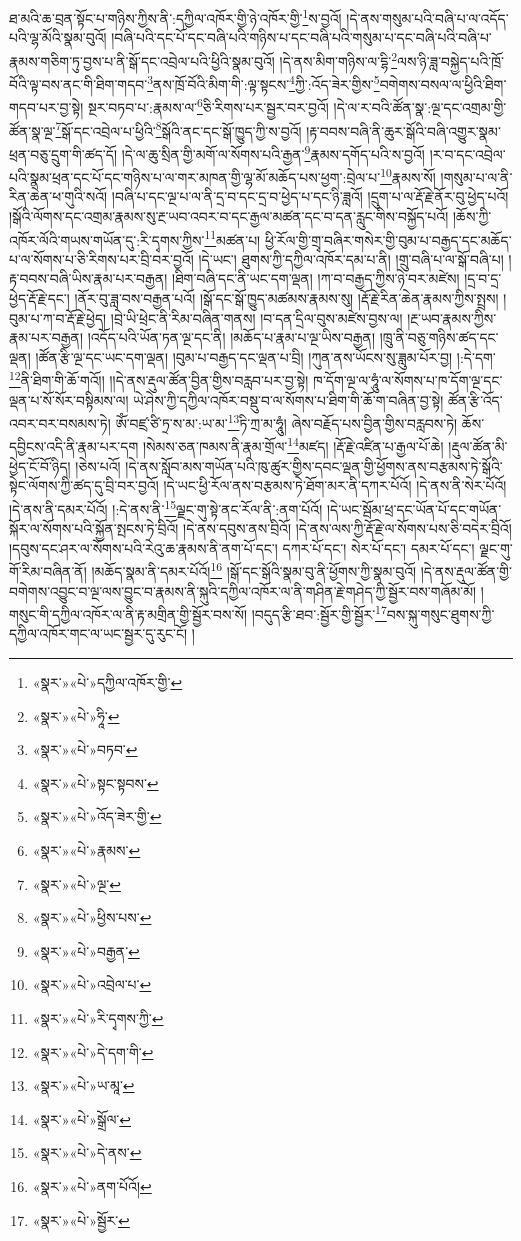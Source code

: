 ཐ་མའི་ཆ་བྲན་སྟོང་པ་གཉིས་ཀྱིས་ནི་:དཀྱིལ་འཁོར་གྱི་ཉེ་འཁོར་གྱི་\footnote{«སྣར་»«པེ་»དཀྱིལ་འཁོར་གྱི་}ས་བྱའོ། །དེ་ནས་གསུམ་པའི་བཞི་པ་ལ་འདོད་པའི་ལྷ་མོའི་སྣམ་བུའོ། །བཞི་པའི་དང་པོ་དང་བཞི་པའི་གཉིས་པ་དང་བཞི་པའི་གསུམ་པ་དང་བཞི་པའི་བཞི་པ་རྣམས་གཅིག་ཏུ་བྱས་པ་ནི་སྒོ་དང་འབྲེལ་པའི་ཕྱིའི་སྣམ་བུའོ། །དེ་ནས་མིག་གཉིས་ལ་དྷི་\footnote{«སྣར་»«པེ་»ཧཱི་}ལས་ཉི་ཟླ་བསྐྱེད་པའི་ཁྲོ་བོའི་ལྟ་བས་ནང་གི་ཐིག་གདབ་\footnote{«སྣར་»«པེ་»བཏབ་}ནས་ཁྲོ་བོའི་མིག་གི་:ལྟ་སྟངས་\footnote{«སྣར་»«པེ་»སྟང་སྟབས་}ཀྱི་:འོད་ཟེར་གྱིས་\footnote{«སྣར་»«པེ་»འོད་ཟེར་གྱི་}བགེགས་བསལ་ལ་ཕྱིའི་ཐིག་གདབ་པར་བྱ་སྟེ། སྔར་བཏབ་པ་:རྣམས་ལ་\footnote{«སྣར་»«པེ་»རྣམས་}ཅི་རིགས་པར་སྦྱར་བར་བྱའོ། །དེ་ལ་ར་བའི་ཚོན་སྣ་:ལྔ་དང་འགྲམ་གྱི་ཚོན་སྣ་ལྔ་\footnote{«སྣར་»«པེ་»ལྔ་}སྒོ་དང་འབྲེལ་པ་ཕྱིའི་\footnote{«སྣར་»«པེ་»ཕྱིས་པས་}སྒོའི་ནང་དང་སྒོ་ཁྱུད་ཀྱི་ས་བྱའོ། །རྟ་བབས་བཞི་ནི་ཆུར་སྒོའི་བཞི་འགྱུར་སྣམ་ཕྲན་བཅུ་དྲུག་གི་ཚད་དོ། །དེ་ལ་ཆུ་སྲིན་གྱི་མགོ་ལ་སོགས་པའི་རྒྱན་\footnote{«སྣར་»«པེ་»བརྒྱན་}རྣམས་དགོད་པའི་ས་བྱའོ། །ར་བ་དང་འབྲེལ་པའི་སྣམ་ཕྲན་དང་པོ་དང་གཉིས་པ་ལ་གར་མཁན་གྱི་ལྷ་མོ་མཆོད་པས་ཕྱག་:བྲེལ་པ་\footnote{«སྣར་»«པེ་»འབྲེལ་པ་}རྣམས་སོ། །གསུམ་པ་ལ་ནི་རིན་ཆེན་ཕ་གུའི་སའོ། །བཞི་པ་དང་ལྔ་པ་ལ་ནི་དྲ་བ་དང་དྲ་བ་ཕྱེད་པ་དང་ཉི་ཟླའོ། །དྲུག་པ་ལ་རྡོ་རྗེ་ནོར་བུ་ཕྱེད་པའོ། །སྒོའི་ལོགས་དང་འགྲམ་རྣམས་སུ་རྔ་ཡབ་འབར་བ་དང་རྒྱལ་མཚན་དང་བ་དན་རླུང་གིས་བསྐྱོད་པའོ། །ཆོས་ཀྱི་འཁོར་ལོའི་གཡས་གཡོན་དུ་:རི་དྭགས་ཀྱིས་\footnote{«སྣར་»«པེ་»རི་དྭགས་ཀྱི་}མཚན་པ། ཕྱི་རོལ་གྱི་གྲྭ་བཞིར་གསེར་གྱི་བུམ་པ་བརྒྱད་དང་མཆོད་པ་ལ་སོགས་པ་ཅི་རིགས་པར་བྲི་བར་བྱའོ། །དེ་ཡང་། ཐུགས་ཀྱི་དཀྱིལ་འཁོར་དམ་པ་ནི། །གྲུ་བཞི་པ་ལ་སྒོ་བཞི་པ། །རྟ་བབས་བཞི་ཡིས་རྣམ་པར་བརྒྱན། །ཐིག་བཞི་དང་ནི་ཡང་དག་ལྡན། །ཀ་བ་བརྒྱད་ཀྱིས་ཉེ་བར་མཛེས། །དྲ་བ་དྲ་ཕྱེད་རྡོ་རྗེ་དང་། །ནོར་བུ་ཟླ་བས་བརྒྱན་པའོ། །སྒོ་དང་སྒོ་ཁྱུད་མཚམས་རྣམས་སུ། །རྡོ་རྗེ་རིན་ཆེན་རྣམས་ཀྱིས་སྤྲས། །བུམ་པ་ཀ་བ་རྡོ་རྗེ་ཕྱེད། །བྲེ་ཡི་ཕྲེང་ནི་རིམ་བཞིན་གནས། །བ་དན་དྲིལ་བུས་མཛེས་བྱས་ལ། །རྔ་ཡབ་རྣམས་ཀྱིས་རྣམ་པར་བརྒྱན། །འདོད་པའི་ཡོན་ཏན་ལྔ་དང་ནི། །མཆོད་པ་རྣམ་པ་ལྔ་ཡིས་བརྒྱན། །ཁྲུ་ནི་བཅུ་གཉིས་ཚད་དང་ལྡན། །ཚོན་རྩི་ལྔ་དང་ཡང་དག་ལྡན། །བུམ་པ་བརྒྱད་དང་ལྡན་པ་བྲི། །ཀུན་ནས་ཡོངས་སུ་ཟླུམ་པོར་བྱ། །:དེ་དག་\footnote{«སྣར་»«པེ་»དེ་དག་གི་}ནི་ཐིག་གི་ཆོ་གའོ།། །།དེ་ནས་རྡུལ་ཚོན་བྱིན་གྱིས་བརླབ་པར་བྱ་སྟེ། ཁ་དོག་ལྔ་ལ་ཧཱུཾ་ལ་སོགས་པ་ཁ་དོག་ལྔ་དང་ལྡན་པ་སོ་སོར་བསྟིམས་ལ། ཡེ་ཤེས་ཀྱི་དཀྱིལ་འཁོར་བསྡུ་བ་ལ་སོགས་པ་ཐིག་གི་ཆོ་ག་བཞིན་བྱ་སྟེ། ཚོན་རྩི་འོད་འབར་བར་བསམས་ཏེ། ཨོཾ་བཛྲ་ཙི་ཏྲ་ས་མ་:ཡ་མ་\footnote{«སྣར་»«པེ་»ཡ་མཱ་}ཏི་ཀྲ་མ་ཧཱུཾ། ཞེས་བརྗོད་པས་བྱིན་གྱིས་བརླབས་ཏེ། ཆོས་དབྱིངས་འདི་ནི་རྣམ་པར་དག །སེམས་ཅན་ཁམས་ནི་རྣམ་གྲོལ་\footnote{«སྣར་»«པེ་»སྒྲོལ་}མཛད། །རྡོ་རྗེ་འཛིན་པ་རྒྱལ་པོ་ཆེ། །རྡུལ་ཚོན་མི་ཕྱེད་ངོ་བོ་ཉིད། །ཅེས་པའོ། །དེ་ནས་སློབ་མས་གཡོན་པའི་ཁུ་ཚུར་གྱིས་དབང་ལྡན་གྱི་ཕྱོགས་ནས་བརྩམས་ཏེ་སྒོའི་སྟེང་ལོགས་ཀྱི་ཚད་དུ་བྲི་བར་བྱའོ། །དེ་ཡང་ཕྱི་རོལ་ནས་བརྩམས་ཏེ་ཐོག་མར་ནི་དཀར་པོའོ། །དེ་ནས་ནི་སེར་པོའོ། །དེ་ནས་ནི་དམར་པོའོ། །:དེ་ནས་ནི་\footnote{«སྣར་»«པེ་»དེ་ནས་}ལྗང་གུ་སྟེ་ནང་རོལ་ནི་:ནག་པོའོ། །དེ་ཡང་སྦོམ་ཕྲ་དང་ཡོན་པོ་དང་གཡོན་སྐོར་ལ་སོགས་པའི་སྐྱོན་སྤངས་ཏེ་བྲིའོ། །དེ་ནས་དབུས་ནས་བྲིའོ། །དེ་ནས་ལས་ཀྱི་རྡོ་རྗེ་ལ་སོགས་པས་ཅི་བདེར་བྲིའོ། །དབུས་དང་ཤར་ལ་སོགས་པའི་རེའུ་ཆ་རྣམས་ནི་ནག་པོ་དང་། དཀར་པོ་དང་། སེར་པོ་དང་། དམར་པོ་དང་། ལྗང་གུ་གོ་རིམ་བཞིན་ནོ། །མཆོད་སྣམ་ནི་དམར་པོའོ།\footnote{«སྣར་»«པེ་»ནག་པོའོ།} །སྒོ་དང་སྒོའི་སྣམ་བུ་ནི་ཕྱོགས་ཀྱི་སྣམ་བུའོ། །དེ་ནས་རྡུལ་ཚོན་གྱི་བགེགས་འབྱུང་བ་ལྔ་ལས་བྱུང་བ་རྣམས་ནི་སྐུའི་དཀྱིལ་འཁོར་ལ་ནི་གཤིན་རྗེ་གཤེད་ཀྱི་སྦྱོར་བས་གཞོམ་མོ། །གསུང་གི་དཀྱིལ་འཁོར་ལ་ནི་རྟ་མགྲིན་གྱི་སྦྱོར་བས་སོ། །བདུད་རྩི་ཐབ་:སྦྱོར་གྱི་སྦྱོར་\footnote{«སྣར་»«པེ་»སྦྱོར་}བས་སྐུ་གསུང་ཐུགས་ཀྱི་དཀྱིལ་འཁོར་གང་ལ་ཡང་སྦྱར་དུ་རུང་ངོ། །
